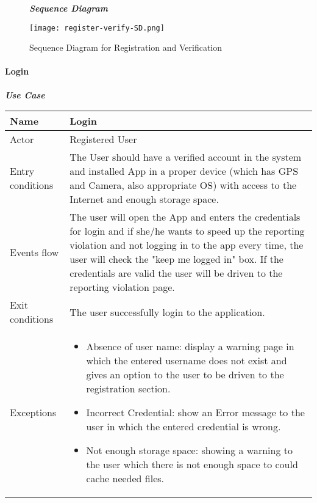 \begin{figure}[H]
\begin{flushleft}\emph{\textbf{Sequence Diagram}}\end{flushleft}
\caption{Sequence Diagram for Registration and Verification}
\label{fig:register-verify-SD}
\centering
\texttt{[image: register-verify-SD.png]}
\end{figure}

\paragraph{Login}
\hfill \break

\begin{table}[H]
\begin{flushleft}\emph{\textbf{Use Case}}\end{flushleft}
\footnotesize
\centering
\settowidth{}
\setlength\extrarowheight{2pt}
\begin{tabulary}{\textwidth}{|J|J|}
\hline
Name             & Login \\
\hline
Actor            & Registered User \\
\hline
Entry conditions & The User should have a verified account in the system and installed App in a proper device (which has GPS and Camera, also appropriate OS) with access to the Internet and enough storage space.\\
\hline 
Events flow      & The user will open the App and enters the credentials for login and if she/he wants to speed up the reporting violation and not logging in to the app every time, the user will check the "keep me logged in" box. If the credentials are valid the user will be driven to the reporting violation page.\\
\hline 
Exit conditions  & The user successfully login to the application.\\
\hline 
Exceptions       & 
\begin{minipage}[t]{0.8\textwidth}
\begin{itemize} 
\item Absence of user name: display a warning page in which the entered username does not exist and gives an option to the user to be driven to the registration section.
\item Incorrect Credential: show an Error message to the user in which the entered credential is wrong.
\item Not enough storage space: showing a warning to the user which there is not enough space to could cache needed files.

\end{itemize}
\end{minipage}
\end{tabulary}
\end{table}
